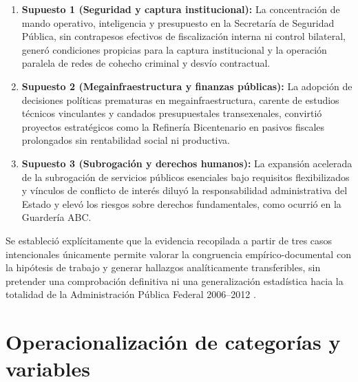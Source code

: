 \begin{enumerate}
  \item \textbf{Supuesto 1 (Seguridad y captura institucional):} La concentración de mando operativo, inteligencia y presupuesto en la Secretaría de Seguridad Pública, sin contrapesos efectivos de fiscalización interna ni control bilateral, generó condiciones propicias para la captura institucional y la operación paralela de redes de cohecho criminal y desvío contractual.
  
  \item \textbf{Supuesto 2 (Megainfraestructura y finanzas públicas):} La adopción de decisiones políticas prematuras en megainfraestructura, carente de estudios técnicos vinculantes y candados presupuestales transexenales, convirtió proyectos estratégicos como la Refinería Bicentenario en pasivos fiscales prolongados sin rentabilidad social ni productiva.
  
  \item \textbf{Supuesto 3 (Subrogación y derechos humanos):} La expansión acelerada de la subrogación de servicios públicos esenciales bajo requisitos flexibilizados y vínculos de conflicto de interés diluyó la responsabilidad administrativa del Estado y elevó los riesgos sobre derechos fundamentales, como ocurrió en la Guardería ABC.
\end{enumerate}

Se estableció explícitamente que la evidencia recopilada a partir de tres casos intencionales únicamente permite valorar la congruencia empírico-documental con la hipótesis de trabajo y generar hallazgos analíticamente transferibles, sin pretender una comprobación definitiva ni una generalización estadística hacia la totalidad de la Administración Pública Federal 2006--2012 \citep{hernandez2014}.

\section{Operacionalización de categorías y variables}

